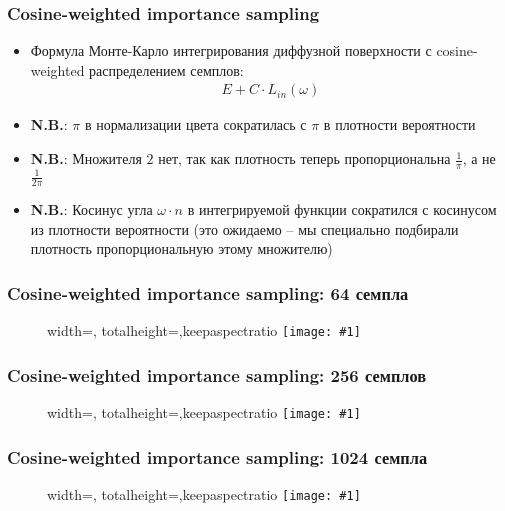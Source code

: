 \documentclass[handout,10pt]{beamer}
\newcommand{\slideimage}[1]{
  \begin{figure}
    \begin{adjustbox}{width=\textwidth, totalheight=\textheight-2\baselineskip-2\baselineskip,keepaspectratio}
      \texttt{[image: \#1]}
    \end{adjustbox}
  \end{figure}
}
\begin{document}
\begin{frame}
\frametitle{Cosine-weighted importance sampling}
\begin{itemize}
\item Формула Монте-Карло интегрирования диффузной поверхности с cosine-weighted распределением семплов:
\begin{gather*}
E + C \cdot L_{in}(\omega)
\end{gather*}
\pause
\item \alert{\textbf{N.B.}}: \begin{math}\pi\end{math} в нормализации цвета сократилась с \begin{math}\pi\end{math} в плотности вероятности
\pause
\item \alert{\textbf{N.B.}}: Множителя \begin{math}2\end{math} нет, так как плотность теперь пропорциональна \begin{math}\frac{1}{\pi}\end{math}, а не \begin{math}\frac{1}{2\pi}\end{math}
\pause
\item \alert{\textbf{N.B.}}: Косинус угла \begin{math}\omega \cdot n\end{math} в интегрируемой функции сократился с косинусом из плотности вероятности (это ожидаемо -- мы специально подбирали плотность пропорциональную этому множителю)
\end{itemize}
\end{frame}

\begin{frame}
\frametitle{Cosine-weighted importance sampling: 64 семпла}
\slideimage{cosine_64.png}
\end{frame}

\begin{frame}
\frametitle{Cosine-weighted importance sampling: 256 семплов}
\slideimage{cosine_256.png}
\end{frame}

\begin{frame}
\frametitle{Cosine-weighted importance sampling: 1024 семпла}
\slideimage{cosine_1024.png}
\end{frame}
\end{document}

